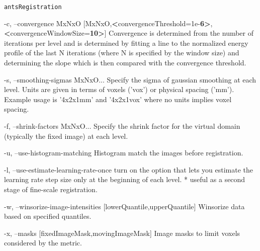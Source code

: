 \documentclass[ignorenonframetext,]{beamer}
\newenvironment{Shaded}{\begin{snugshade}}{\end{snugshade}}
\newcommand{\StringTok}[1]{\textcolor[rgb]{0.31,0.60,0.02}{#1}}
\newcommand{\FunctionTok}[1]{\textcolor[rgb]{0.00,0.00,0.00}{#1}}
\newcommand{\OperatorTok}[1]{\textcolor[rgb]{0.81,0.36,0.00}{\textbf{#1}}}
\newcommand{\BuiltInTok}[1]{#1}
\newcommand{\ExtensionTok}[1]{#1}
\newcommand{\NormalTok}[1]{#1}
\begin{document}
\begin{frame}[fragile]{\texttt{antsRegistration}}
\begin{Shaded}
\begin{Highlighting}[]
     \ExtensionTok{-c}\NormalTok{, --convergence MxNxO}
\NormalTok{                       [}\ExtensionTok{MxNxO}\NormalTok{,}\OperatorTok{<}\NormalTok{convergenceThreshold=1e-}\OperatorTok{6>}\NormalTok{,}\OperatorTok{<}\NormalTok{convergenceWindowSize=}\OperatorTok{10>}\NormalTok{]}
          \ExtensionTok{Convergence}\NormalTok{ is determined from the number of iterations per level and is}
          \ExtensionTok{determined}\NormalTok{ by fitting a line to the normalized energy profile of the last N}
          \ExtensionTok{iterations}\NormalTok{ (where N is specified by the window size) }\ExtensionTok{and}\NormalTok{ determining the slope}
          \FunctionTok{which}\NormalTok{ is then compared with the convergence threshold.}

     \ExtensionTok{-s}\NormalTok{, --smoothing-sigmas MxNxO...}
          \ExtensionTok{Specify}\NormalTok{ the sigma of gaussian smoothing at each level. Units are given in terms}
          \ExtensionTok{of}\NormalTok{ voxels (}\StringTok{'vox'}\NormalTok{) }\ExtensionTok{or}\NormalTok{ physical spacing (}\StringTok{'mm'}\NormalTok{)}\BuiltInTok{.} \ExtensionTok{Example}\NormalTok{ usage is }\StringTok{'4x2x1mm'}\NormalTok{ and}
          \StringTok{'4x2x1vox'} \ExtensionTok{where}\NormalTok{ no units implies voxel spacing.}

     \ExtensionTok{-f}\NormalTok{, --shrink-factors MxNxO...}
          \ExtensionTok{Specify}\NormalTok{ the shrink factor for the virtual domain (typically the fixed image) }\ExtensionTok{at}
          \ExtensionTok{each}\NormalTok{ level.}

     \ExtensionTok{-u}\NormalTok{, --use-histogram-matching}
          \ExtensionTok{Histogram}\NormalTok{ match the images before registration.}

     \ExtensionTok{-l}\NormalTok{, --use-estimate-learning-rate-once}
          \ExtensionTok{turn}\NormalTok{ on the option that lets you estimate the learning rate step size only at}
          \ExtensionTok{the}\NormalTok{ beginning of each level. * useful as a second stage of fine-scale}
          \ExtensionTok{registration.}

     \ExtensionTok{-w}\NormalTok{, --winsorize-image-intensities [lowerQuantile,upperQuantile]}
          \ExtensionTok{Winsorize}\NormalTok{ data based on specified quantiles.}

     \ExtensionTok{-x}\NormalTok{, --masks [fixedImageMask,movingImageMask]}
          \ExtensionTok{Image}\NormalTok{ masks to limit voxels considered by the metric.}


\end{Highlighting}
\end{Shaded}
\end{frame}
\end{document}
